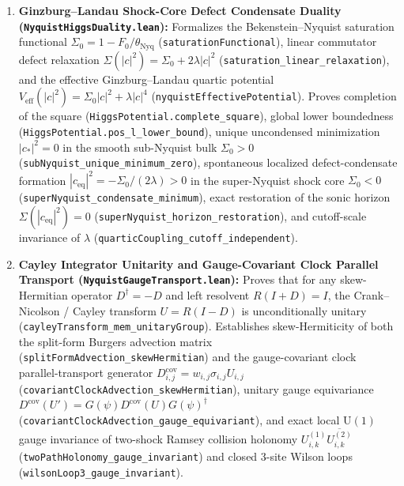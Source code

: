 \documentclass[11pt,a4paper]{article}
\theoremstyle{definition}
\begin{document}
\begin{enumerate}
\item \textbf{Ginzburg--Landau Shock-Core Defect Condensate Duality (\texttt{Nyquist\allowbreak{}Higgs\allowbreak{}Duality.lean}):}
Formalizes the Bekenstein--Nyquist saturation functional $\Sigma_0 = 1 - F_0 / \theta_{\text{Nyq}}$ (\texttt{saturationFunctional}), linear commutator defect relaxation $\Sigma(|c|^2) = \Sigma_0 + 2\lambda |c|^2$ (\texttt{saturation\_\allowbreak{}linear\_\allowbreak{}relaxation}), and the effective Ginzburg--Landau quartic potential $V_{\text{eff}}(|c|^2) = \Sigma_0 |c|^2 + \lambda |c|^4$ (\texttt{nyquistEffectivePotential}). Proves completion of the square (\texttt{HiggsPotential.complete\_\allowbreak{}square}), global lower boundedness (\texttt{HiggsPotential.pos\_\allowbreak{}l\_\allowbreak{}lower\_\allowbreak{}bound}), unique uncondensed minimization $|c_*|^2 = 0$ in the smooth sub-Nyquist bulk $\Sigma_0 > 0$ (\texttt{subNyquist\_\allowbreak{}unique\_\allowbreak{}minimum\_\allowbreak{}zero}), spontaneous localized defect-condensate formation $|c_{\text{eq}}|^2 = -\Sigma_0 / (2\lambda) > 0$ in the super-Nyquist shock core $\Sigma_0 < 0$ (\texttt{superNyquist\_\allowbreak{}condensate\_\allowbreak{}minimum}), exact restoration of the sonic horizon $\Sigma(|c_{\text{eq}}|^2) = 0$ (\texttt{superNyquist\_\allowbreak{}horizon\_\allowbreak{}restoration}), and cutoff-scale invariance of $\lambda$ (\texttt{quarticCoupling\_\allowbreak{}cutoff\_\allowbreak{}independent}).
\item \textbf{Cayley Integrator Unitarity and Gauge-Covariant Clock Parallel Transport (\texttt{Nyquist\allowbreak{}Gauge\allowbreak{}Transport.lean}):}
Proves that for any skew-Hermitian operator $D^\dagger = -D$ and left resolvent $R(I + D) = I$, the Crank--Nicolson / Cayley transform $U = R(I - D)$ is unconditionally unitary (\texttt{cayleyTransform\_\allowbreak{}mem\_\allowbreak{}unitaryGroup}). Establishes skew-Hermiticity of both the split-form Burgers advection matrix (\texttt{splitFormAdvection\_\allowbreak{}skewHermitian}) and the gauge-covariant clock parallel-transport generator $D^{\text{cov}}_{i,j} = w_{i,j}\sigma_{i,j} U_{i,j}$ (\texttt{covariantClockAdvection\_\allowbreak{}skewHermitian}), unitary gauge equivariance $D^{\text{cov}}(U') = G(\psi) D^{\text{cov}}(U) G(\psi)^\dagger$ (\texttt{covariantClockAdvection\_\allowbreak{}gauge\_\allowbreak{}equivariant}), and exact local $\mathrm{U}(1)$ gauge invariance of two-shock Ramsey collision holonomy $U^{(1)}_{i,k}\overline{U^{(2)}_{i,k}}$ (\texttt{twoPathHolonomy\_\allowbreak{}gauge\_\allowbreak{}invariant}) and closed 3-site Wilson loops (\texttt{wilsonLoop3\_\allowbreak{}gauge\_\allowbreak{}invariant}).

\end{enumerate}
\end{document}
